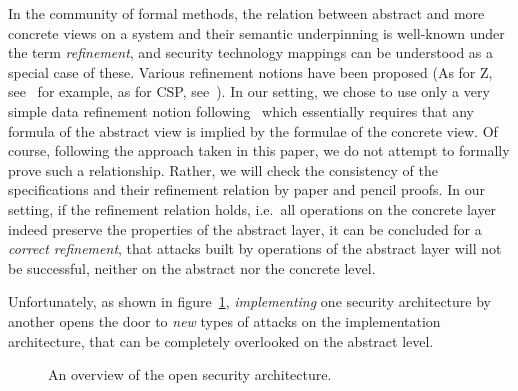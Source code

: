 In the community of formal methods, the relation between abstract and
more concrete views on a system and their semantic underpinning is
well-known under the term \emph{refinement}, and
security technology mappings can be understood as a special case of
these. Various refinement notions have been proposed (As for Z,
see~\cite{woodcock.ea:using:1996} for example, as for CSP,
see~\cite{roscoe:csp:98}).  In our setting, we chose to use only a
very simple data refinement notion
following~\cite{spivey:z_notation:1992} which essentially requires
that any formula of the abstract view is implied by the formulae of
the concrete view.  Of course, following the approach taken in this
paper, we do not attempt to formally prove such a relationship.
Rather, we will check the consistency of the specifications and their
refinement relation by paper and pencil proofs. In our setting, if the
refinement relation holds, i.e.\ all operations on the concrete layer
indeed preserve the properties of the abstract layer, it can be
concluded for a \emph{correct refinement}, that attacks built by
operations of the abstract layer will not be successful, neither on
the abstract nor the concrete level.
  
Unfortunately, as shown in figure~\ref{fig:refsec2},
\emph{implementing} one security
architecture by another opens the door to \emph{new} types of attacks
on the implementation architecture, that can be completely overlooked
on the abstract level.
\begin{figure}
  \center
  \caption{An overview of the open security architecture.\label{fig:refsec2}}
\end{figure}

